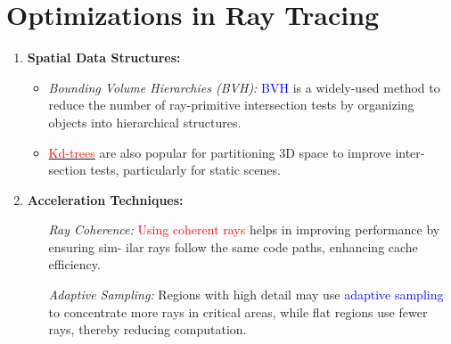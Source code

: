 \documentclass{article}
\begin{document}
\section{Optimizations in Ray Tracing}
\begin{enumerate}
    \item \textbf{Spatial Data Structures:}
    \begin{itemize}
        \item \textit{Bounding Volume Hierarchies (BVH):} \textcolor{blue}{BVH} is a widely-used method
        to reduce the number of ray-primitive intersection tests by organizing
        objects into hierarchical structures.
        \item \underline{\textcolor{red}{Kd-trees}} are also popular for partitioning 3D space to improve inter-
        section tests, particularly for static scenes.
    \end{itemize}
    \item \textbf{Acceleration Techniques:}
    \begin{itemize}
        \item[\textit{Ray Coherence:}] \textcolor{red}{Using coherent rays} helps in improving performance by ensuring sim-
        ilar rays follow the same code paths, enhancing cache efficiency.
        \item[\textit{Adaptive Sampling:}] Regions with high detail may use \textcolor{blue}{adaptive sampling} to concentrate
        more rays in critical areas, while flat regions use fewer rays, thereby
        reducing computation.
    \end{itemize}
\end{enumerate}
\printbibliography
\end{document}
